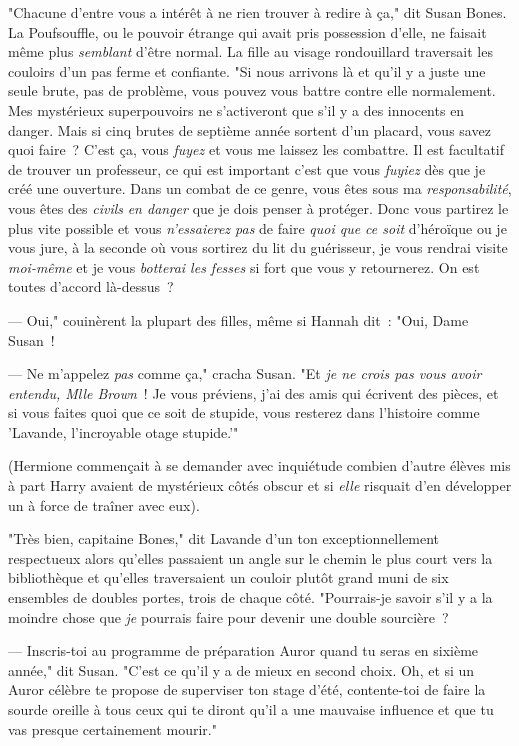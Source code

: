 "Chacune d'entre vous a intérêt à ne rien trouver à redire à ça," dit Susan Bones. La Poufsouffle, ou le pouvoir étrange qui avait pris possession d'elle, ne faisait même plus \emph{semblant} d'être normal. La fille au visage rondouillard traversait les couloirs d'un pas ferme et confiante. "Si nous arrivons là et qu'il y a juste une seule brute, pas de problème, vous pouvez vous battre contre elle normalement. Mes mystérieux superpouvoirs ne s'activeront que s'il y a des innocents en danger. Mais si cinq brutes de septième année sortent d'un placard, vous savez quoi faire~? C'est ça, vous \emph{fuyez} et vous me laissez les combattre. Il est facultatif de trouver un professeur, ce qui est important c'est que vous \emph{fuyiez} dès que je créé une ouverture. Dans un combat de ce genre, vous êtes sous ma \emph{responsabilité}, vous êtes des \emph{civils} \emph{en danger} que je dois penser à protéger. Donc vous partirez le plus vite possible et vous \emph{n'essaierez pas} de faire \emph{quoi que ce soit} d'héroïque ou je vous jure, à la seconde où vous sortirez du lit du guérisseur, je vous rendrai visite \emph{moi-même} et je vous \emph{botterai les fesses} si fort que vous y retournerez. On est toutes d'accord là-dessus~?

--- Oui," couinèrent la plupart des filles, même si Hannah dit~: "Oui, Dame Susan~!

--- Ne m'appelez \emph{pas} comme ça," cracha Susan. "Et \emph{je ne crois pas vous avoir entendu, Mlle Brown}~! Je vous préviens, j'ai des amis qui écrivent des pièces, et si vous faites quoi que ce soit de stupide, vous resterez dans l'histoire comme 'Lavande, l'incroyable otage stupide.'"

(Hermione commençait à se demander avec inquiétude combien d'autre élèves mis à part Harry avaient de mystérieux côtés obscur et si \emph{elle} risquait d'en développer un à force de traîner avec eux).

"Très bien, capitaine Bones," dit Lavande d'un ton exceptionnellement respectueux alors qu'elles passaient un angle sur le chemin le plus court vers la bibliothèque et qu'elles traversaient un couloir plutôt grand muni de six ensembles de doubles portes, trois de chaque côté. "Pourrais-je savoir s'il y a la moindre chose que \emph{je} pourrais faire pour devenir une double sourcière~?

--- Inscris-toi au programme de préparation Auror quand tu seras en sixième année," dit Susan. "C'est ce qu'il y a de mieux en second choix. Oh, et si un Auror célèbre te propose de superviser ton stage d'été, contente-toi de faire la sourde oreille à tous ceux qui te diront qu'il a une mauvaise influence et que tu vas presque certainement mourir."

